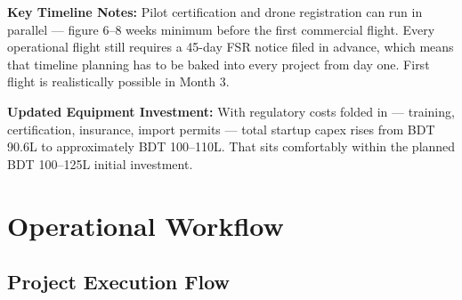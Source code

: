 \textbf{Key Timeline Notes:} Pilot certification and drone registration can run in parallel --- figure 6--8 weeks minimum before the first commercial flight. Every operational flight still requires a 45-day FSR notice filed in advance, which means that timeline planning has to be baked into every project from day one. First flight is realistically possible in Month 3.

\textbf{Updated Equipment Investment:} With regulatory costs folded in --- training, certification, insurance, import permits --- total startup capex rises from BDT 90.6L to approximately BDT 100--110L. That sits comfortably within the planned BDT 100--125L initial investment.

\section{Operational Workflow}

\subsection{Project Execution Flow}

